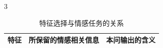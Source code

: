 \begin{PaperTable}{3}

\begin{table}[!htbp]
\centering\caption{特征选择与情感任务的关系}
\begin{tabular}{@{}lll@{}}
\toprule
\begin{minipage}[b]{\dimexpr 0.260000\linewidth-1.040000\tabcolsep\relax}\raggedright
特征\strut
\end{minipage} & \begin{minipage}[b]{\dimexpr 0.440000\linewidth-1.760000\tabcolsep\relax}\raggedright
所保留的情感相关信息\strut
\end{minipage} & \begin{minipage}[b]{\dimexpr 0.300000\linewidth-1.200000\tabcolsep\relax}\raggedright
本问输出的含义\strut
\end{minipage}\tabularnewline
\midrule


\end{tabular}
\end{table}
\end{PaperTable}
